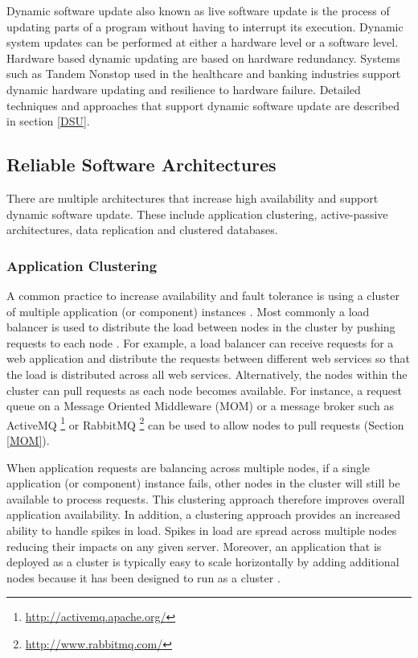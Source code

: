 \documentclass[a4paper,11pt,twoside]{article}
\begin{document}
Dynamic software update also known as live software update is the process of updating parts of a program without having to interrupt its execution. Dynamic system updates can be performed at either a hardware level or a software level. Hardware based dynamic updating are based on hardware redundancy. Systems such as Tandem Nonstop \cite{Tandem} used in the healthcare and banking industries support dynamic hardware updating and resilience to hardware failure. Detailed techniques and approaches that support dynamic software update are described in section \ref{DSU}. 


\subsection{Reliable Software Architectures} \label{Architectures}
There are multiple architectures that increase high availability and support dynamic software update. These include application clustering, active-passive architectures, data replication and clustered databases.

\subsubsection{Application Clustering}
A common practice to increase availability and fault tolerance is using a cluster of multiple application (or component) instances \cite{Clustring}. Most commonly a load balancer is used to distribute the load between nodes in the cluster by pushing requests to each node \cite{balancer}. For example, a load balancer can receive requests for a web application and distribute the requests between different web services so that the load is distributed across all web services. Alternatively, the nodes within the cluster can pull requests as each node becomes available. For instance, a request queue on a Message Oriented Middleware (MOM) or a message broker such as ActiveMQ \footnote{ \url{http://activemq.apache.org/}} or RabbitMQ \footnote{ \url{http://www.rabbitmq.com/}} can be used to allow nodes to pull requests (Section \ref{MOM}).

When application requests are balancing across multiple nodes, if a single application (or component) instance fails, other nodes in the cluster will still be available to process requests. This clustering approach therefore improves overall application availability. In addition, a clustering approach provides an increased ability to handle spikes in load. Spikes in load are spread across multiple nodes reducing their impacts on any given server. Moreover, an application that is deployed as a cluster is typically easy to scale horizontally by adding additional nodes because it has been designed to run as a cluster \cite{Clustring}.
\end{document}
